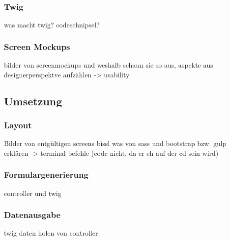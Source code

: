     \subsubsection{Twig}

was macht twig? codeschnipsel?

    \subsubsection{Screen Mockups}

bilder von screenmockups und weshalb schaun sie so aus, aspekte aus designerperspektve aufzählen -> usability

  \subsection{Umsetzung}

    \subsubsection{Layout}

Bilder von entgültigen screens
bissl was von sass und bootstrap bzw. gulp erklären -> terminal befehle (code nicht, da er eh auf der cd sein wird)

    \subsubsection{Formulargenerierung}

controller und twig

    \subsubsection{Datenausgabe}

twig daten holen von controller 
